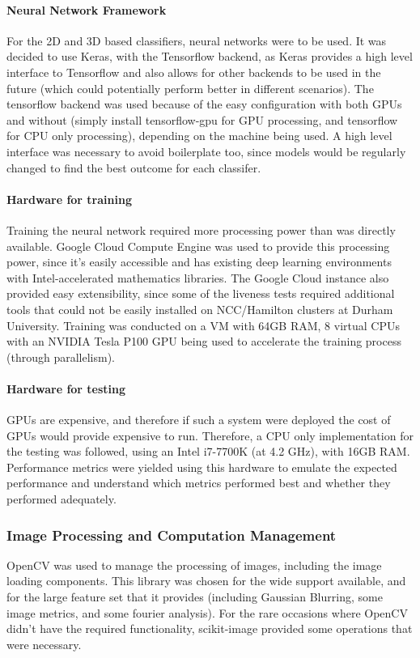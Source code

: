 \documentclass[11pt,a4paper]{article}
\begin{document}
            \paragraph{Neural Network Framework} 
            For the 2D and 3D based classifiers, neural networks were to be used. It was decided to use Keras, with the Tensorflow backend, as Keras provides a high level interface to Tensorflow
            and also allows for other backends to be used in the future (which could potentially perform better in different scenarios). The tensorflow backend was used because of the easy configuration
            with both GPUs and without (simply install tensorflow-gpu for GPU processing, and tensorflow for CPU only processing), depending on the machine being used. A high level interface was necessary
            to avoid boilerplate too, since models would be regularly changed to find the best outcome for each classifer.

            \paragraph{Hardware for training}
            Training the neural network required more processing power than was directly available. Google Cloud Compute Engine was used to provide this processing power, since it's easily accessible and has existing
            deep learning environments with Intel-accelerated mathematics libraries. The Google Cloud instance also provided easy extensibility, since some of the liveness tests required additional tools that could not be easily installed
            on NCC/Hamilton clusters at Durham University. Training was conducted on a VM with 64GB RAM, 8 virtual CPUs with an NVIDIA Tesla P100 GPU being used to accelerate the training process (through parallelism).

            \paragraph{Hardware for testing}
            GPUs are expensive, and therefore if such a system were deployed the cost of GPUs would provide expensive to run. Therefore, a CPU only implementation for the testing was followed, using an Intel i7-7700K (at 4.2 GHz), with
            16GB RAM. Performance metrics were yielded using this hardware to emulate the expected performance and understand which metrics performed best and whether they performed adequately.

        \subsubsection{Image Processing and Computation Management}
            OpenCV was used to manage the processing of images, including the image loading components. This library was chosen for the wide support available, and for the large feature set that it provides (including Gaussian Blurring, some image metrics, and some fourier analysis).
            For the rare occasions where OpenCV didn't have the required functionality, scikit-image provided some operations that were necessary.
            
\end{document}
